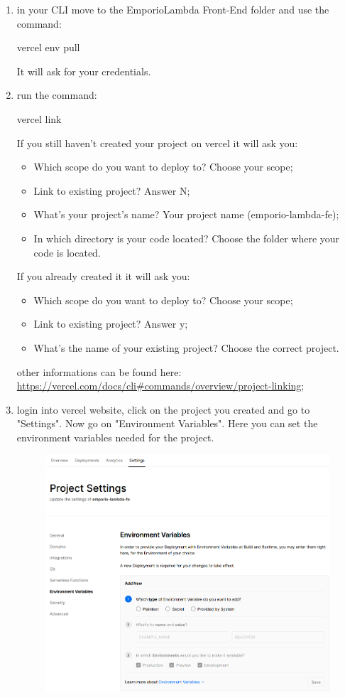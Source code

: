 \begin{enumerate}
\item in your CLI move to the EmporioLambda Front-End folder and use the command:\begin{center}vercel env pull\end{center}It will ask for your credentials.
\item run the command:\begin{center}vercel link\end{center} If you still haven't created your project on vercel it will ask you:
\begin{itemize}
\item Which scope do you want to deploy to? Choose your scope;
\item Link to existing project? Answer N;
\item What’s your project’s name? Your project name (emporio-lambda-fe);
\item In which directory is your code located? Choose the folder where your code is located.
\end{itemize}
If you already created it it will ask you:
\begin{itemize}
\item Which scope do you want to deploy to? Choose your scope;
\item Link to existing project? Answer y;
\item What’s the name of your existing project? Choose the correct project.
\end{itemize}
other informations can be found here: \url{https://vercel.com/docs/cli\#commands/overview/project-linking};
\item login into vercel website, click on the project you created and go to "Settings". Now go on "Environment Variables". Here you can set the environment variables needed for the project.\\
\begin{figure}[H]
\centering
\includegraphics[scale=0.55]{res/Setup/Configurazione/img/settingsEnvVar}\\

\end{figure}
\end{enumerate}
